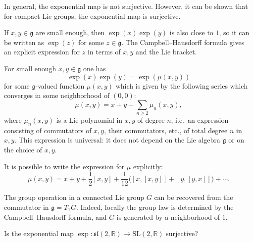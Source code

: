 \documentclass[12pt]{article}
\begin{document}
In general, the exponential map is not surjective. However, it can be shown that for compact Lie groups, the exponential map is surjective.

If $x,y\in \mathfrak g$ are small enough, then $\exp(x)\exp(y)$ is also close to $1$, so it can be written as $\exp(z)$ for some $z\in \mathfrak g$. The Campbell--Hausdorff formula gives an explicit expression for $z$ in terms of $x,y$ and the Lie bracket.
\begin{theorem}
    For small enough $x,y\in \mathfrak g$ one has
    \[
        \exp(x)\exp(y)=\exp(\mu(x,y))
    \]
    for some $\mathfrak g$-valued function $\mu(x,y)$ which is given by the following
    series which converges in some neighborhood of $(0,0)$:
    \begin{equation}\label{eq:3.14}
        \mu(x,y)=x+y+\sum_{n\ge 2}\mu_n(x,y),
    \end{equation}
    where $\mu_n(x,y)$ is a Lie polynomial in $x,y$ of degree $n$, i.e.\ an expression
    consisting of commutators of $x,y$, their commutators, etc., of total degree $n$ in $x,y$. This expression is universal: it does not depend on the Lie algebra
    $\mathfrak g$ or on the choice of $x,y$.

    It is possible to write the expression for $\mu$ explicitly:
    \begin{equation}\label{eq:3.15}
        \mu(x,y)
        = x+y+\frac{1}{2}[x,y]
        +\frac{1}{12}\big([x,[x,y]]+[y,[y,x]]\big)+\cdots.
    \end{equation}
\end{theorem}

\begin{corollary}
    The group operation in a connected Lie group $G$ can be recovered from the
    commutator in $\mathfrak g = T_1G$. Indeed, locally the group law is determined by the Campbell--Hausdorff formula, and $G$ is generated by a neighborhood of $1$.
\end{corollary}

\begin{exercise}
    Is the exponential map $\exp : \mathfrak{sl}(2, \mathbb{R}) \to \mathrm{SL}(2, \mathbb{R})$ surjective?
\end{exercise}
\end{document}

